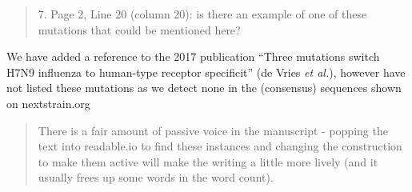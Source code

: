 \documentclass[12pt,a4paper]{article}
\begin{document}
\begin{quote}
7. Page 2, Line 20 (column 20): is there an example of one of these mutations that could be mentioned here?
\end{quote}
We have added a reference to the 2017 publication ``Three mutations switch H7N9 influenza to human-type receptor specificit'' (de Vries \textit{et al.}), however have not listed these mutations as we detect none in the (consensus) sequences shown on nextstrain.org

\begin{quote}
There is a fair amount of passive voice in the manuscript - popping the text into readable.io to find these instances and changing the construction to make them active will make the writing a little more lively (and it usually frees up some words in the word count).

\end{quote}
\end{document}
